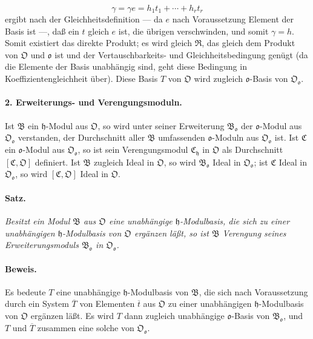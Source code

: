 \[
\gamma=\gamma e=h_1t_1+\cdots+h_rt_r
\]
ergibt nach der Gleichheitsdefinition --- da $e$ nach Voraussetzung Element der Basis ist ---, daß ein $t$ gleich $e$ ist, die übrigen verschwinden, und somit $\gamma=h$. Somit existiert das direkte Produkt; es wird gleich $\mathfrak R$, das gleich dem Produkt von $\mathfrak O$ und $\mathfrak o$ ist und der Vertauschbarkeits- und Gleichheitsbedingung genügt (da die Elemente der Basis unabhängig sind, geht diese Bedingung in Koeffizientengleichheit über). Diese Basis $T$ von $\mathfrak O$ wird zugleich $\mathfrak o$-Basis von $\mathfrak O_{\mathfrak o}$.

\paragraph{2. Erweiterungs- und Verengungsmoduln.}
Ist $\mathfrak B$ ein $\mathfrak h$-Modul aus $\mathfrak O$, so wird unter seiner Erweiterung $\mathfrak B_{\mathfrak o}$ der $\mathfrak o$-Modul aus $\mathfrak O_{\mathfrak o}$ verstanden, der Durchschnitt aller $\mathfrak B$ umfassenden $\mathfrak o$-Moduln aus $\mathfrak O_{\mathfrak o}$ ist. Ist $\mathfrak C$ ein $\mathfrak o$-Modul aus $\mathfrak O_{\mathfrak o}$, so ist sein Verengungsmodul $\mathfrak C_{\mathfrak h}$ in $\mathfrak O$ als Durchschnitt $[\mathfrak C,\mathfrak O]$ definiert. Ist $\mathfrak B$ zugleich Ideal in $\mathfrak O$, so wird $\mathfrak B_{\mathfrak o}$ Ideal in $\mathfrak O_{\mathfrak o}$; ist $\mathfrak C$ Ideal in $\mathfrak O_{\mathfrak o}$, so wird $[\mathfrak C,\mathfrak O]$ Ideal in $\mathfrak O$.

\paragraph{Satz.}
\emph{Besitzt ein Modul $\mathfrak B$ aus $\mathfrak O$ eine unabhängige $\mathfrak h$-Modulbasis, die sich zu einer unabhängigen $\mathfrak h$-Modulbasis von $\mathfrak O$ ergänzen läßt, so ist $\mathfrak B$ Verengung seines Erweiterungsmoduls $\mathfrak B_{\mathfrak o}$ in $\mathfrak O_{\mathfrak o}$.}

\paragraph{Beweis.}
Es bedeute $T$ eine unabhängige $\mathfrak h$-Modulbasis von $\mathfrak B$, die sich nach Voraussetzung durch ein System $\overline T$ von Elementen $\overline t$ aus $\mathfrak O$ zu einer unabhängigen $\mathfrak h$-Modulbasis von $\mathfrak O$ ergänzen läßt. Es wird $T$ dann zugleich unabhängige $\mathfrak o$-Basis von $\mathfrak B_{\mathfrak o}$, und $T$ und $\overline T$ zusammen eine solche von $\mathfrak O_{\mathfrak o}$.


